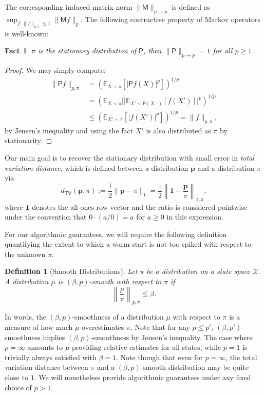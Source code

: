 \documentclass[11pt]{article}
\newtheorem{defn}[thm]{Definition}
\newtheorem{fact}[thm]{Fact}
\theoremstyle{remark}
\begin{document}
The corresponding induced matrix norm $\|\mathsf{M}\|_{p\to p}$ is defined as $\sup_{f:\|f\|_{p,\pi}\leq 1} \|\mathsf{M}f\|_p$. The following contractive property of Markov operators is well-known:
\begin{fact}
\label{fact:contract}
    $\pi$ is the stationary distribution of $\mathsf{P}$, then $\|\mathsf{P}\|_{p\to p}=1$ for all $p\geq 1$.
\end{fact}
\begin{proof}
We may simply compute:
\begin{align*}
    \|\mathsf{P}f\|_{p,\pi} &= \left(\mathbb{E}_{X\sim\pi}[\vert \mathsf{P}f(X)\vert^p]\right)^{1/p}\\
    &=\left(\mathbb{E}_{X\sim\pi}[\vert \mathbb{E}_{X'\sim \mathsf{P}(X,\cdot)}[ f(X')]\vert^p\right)^{1/p}\\
    &\leq \left(\mathbb{E}_{X'\sim \pi}[\vert f(X')\vert^p]\right)^{1/p}=\|f\|_{p,\pi},
\end{align*}
by Jensen's inequality and using the fact $X'$ is also distributed as $\pi$ by stationarity.
\end{proof}

Our main goal is to recover the stationary distribution with small error in \emph{total variation distance}, which is defined between a distribution $\bm{p}$ and a distribution $\pi$ via
\begin{equation*}
    d_{\mathsf{TV}}(\bm{p},\pi):=\frac{1}{2}\|\bm{p}-\pi\|_1=\frac{1}{2}\left\|\bm{1}-\frac{\bm{p}}{\pi}\right\|_{1,\pi},
\end{equation*}
where $\bm{1}$ denotes the all-ones row vector and the ratio is considered pointwise under the convention that $0\cdot (a/0) = a$ for $a\geq 0$ in this expression. 

For our algorithmic guarantees, we will require the following definition quantifying the extent to which a warm start is not too spiked with respect to the unknown $\pi$:
\begin{defn}[Smooth Distributions]
    Let $\pi$ be a distribution on a state space $\mathcal{X}$. A distribution $\mu$ is $(\beta,p)$-smooth with respect to $\pi$ if 
    \begin{equation*}
        \left\|\frac{\mu}{\pi}\right\|_{p,\pi}\leq \beta.
    \end{equation*}
\end{defn}
In words, the $(\beta,p)$-smoothness of a distribution $\mu$ with respect to $\pi$ is a measure of how much $\mu$ overestimates $\pi$. Note that for any $p\leq p'$, $(\beta,p')$-smoothness implies $(\beta,p)$-smoothness by Jensen's inequality. The case where $p=\infty$ amounts to $\mu$ providing relative estimates for all states, while $p=1$ is trivially always satisfied with $\beta=1$. Note though that even for $p=\infty$, the total variation distance between $\pi$ and a $(\beta,p)$-smooth distribution may be quite close to $1$. We will nonetheless provide algorithmic guarantees under any fixed choice of $p>1$.
\end{document}
